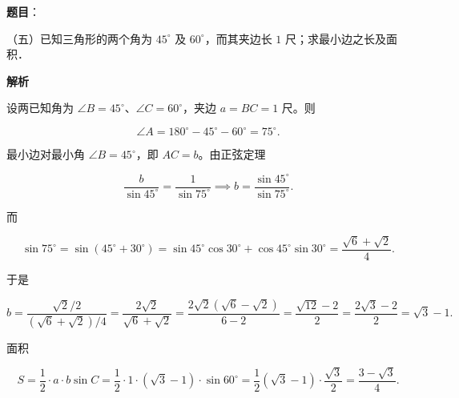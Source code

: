 \begin{answer}

\textbf{题目}：

（五）已知三角形的两个角为 $45^\circ$ 及 $60^\circ$，而其夹边长 $1$ 尺；求最小边之长及面积．

\textbf{解析}

设两已知角为 $\angle B=45^\circ$、$\angle C=60^\circ$，夹边 $a=BC=1$ 尺。则

\nopagebreak[4]
\[
\angle A=180^\circ-45^\circ-60^\circ=75^\circ.
\]

最小边对最小角 $\angle B=45^\circ$，即 $AC=b$。由正弦定理

\nopagebreak[4]
\[
\frac{b}{\sin45^\circ}=\frac{1}{\sin75^\circ}
\implies b=\frac{\sin45^\circ}{\sin75^\circ}.
\]

而

\nopagebreak[4]
\[
\sin75^\circ=\sin(45^\circ+30^\circ)=\sin45^\circ\cos30^\circ+\cos45^\circ\sin30^\circ
=\frac{\sqrt6+\sqrt2}{4}.
\]

于是

\nopagebreak[4]
\[
b=\frac{\sqrt2/2}{(\sqrt6+\sqrt2)/4}
=\frac{2\sqrt2}{\sqrt6+\sqrt2}
=\frac{2\sqrt2(\sqrt6-\sqrt2)}{6-2}
=\frac{\sqrt{12}-2}{2}
=\frac{2\sqrt3-2}{2}
=\sqrt3-1.
\]

面积

\nopagebreak[4]
\[
S=\frac12\cdot a\cdot b\sin C
=\frac12\cdot1\cdot(\sqrt3-1)\cdot\sin60^\circ
=\frac12(\sqrt3-1)\cdot\frac{\sqrt3}{2}
=\frac{3-\sqrt3}{4}.
\]


\end{answer}